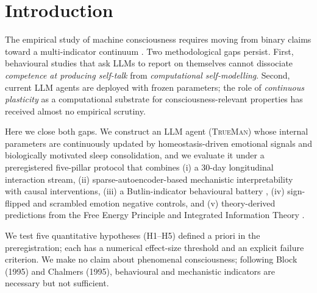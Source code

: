 \documentclass[pdflatex,sn-mathphys-num]{sn-jnl}
\newcommand{\TrueMan}{\textsc{TrueMan}}
\theoremstyle{thmstyleone}
\theoremstyle{thmstylethree}
\begin{document}
\section{Introduction}\label{sec:intro}

The empirical study of machine consciousness requires moving from binary claims toward a multi-indicator continuum \cite{ny_declaration_2024, butlin2023consciousness}. Two methodological gaps persist. First, behavioural studies that ask LLMs to report on themselves cannot dissociate \emph{competence at producing self-talk} from \emph{computational self-modelling}. Second, current LLM agents are deployed with frozen parameters; the role of \emph{continuous plasticity} as a computational substrate for consciousness-relevant properties has received almost no empirical scrutiny.

Here we close both gaps. We construct an LLM agent (\TrueMan{}) whose internal parameters are continuously updated by homeostasis-driven emotional signals and biologically motivated sleep consolidation, and we evaluate it under a preregistered \cite{preregistration} five-pillar protocol that combines (i) a 30-day longitudinal interaction stream, (ii) sparse-autoencoder-based mechanistic interpretability with causal interventions, (iii) a Butlin-indicator behavioural battery \cite{butlin2023consciousness}, (iv) sign-flipped and scrambled emotion negative controls, and (v) theory-derived predictions from the Free Energy Principle \cite{friston2022active} and Integrated Information Theory \cite{tononi2023iit}.

We test five quantitative hypotheses (H1--H5) defined a priori in the preregistration; each has a numerical effect-size threshold and an explicit failure criterion. We make no claim about phenomenal consciousness; following Block (1995) and Chalmers (1995), behavioural and mechanistic indicators are necessary but not sufficient.
\end{document}
